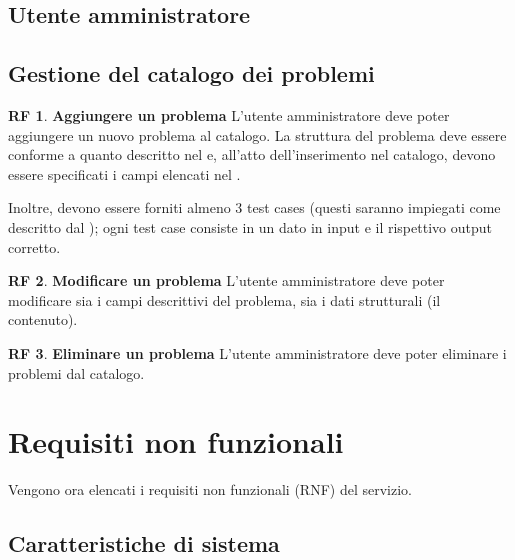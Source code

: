\documentclass[11pt, a4paper]{article}
\theoremstyle{definition}
\newtheorem{funcreq}{RF} %
\begin{document}
\begin{center}
    \section*{Utente amministratore}
\end{center}

\subsection{Gestione del catalogo dei problemi}

\begin{funcreq}
\textbf{Aggiungere un problema }
L'utente amministratore deve poter aggiungere un nuovo problema al catalogo.
La struttura del problema deve essere conforme a quanto descritto nel
\textcolor{blue}{}
e, all'atto dell'inserimento nel catalogo, devono essere specificati i campi
elencati nel \textcolor{blue}{}.

Inoltre, devono essere forniti almeno 3 test cases (questi saranno impiegati
come descritto dal \textcolor{blue}{});
ogni test case consiste in un dato in input e il rispettivo output corretto.
\end{funcreq}

\begin{funcreq}
\textbf{Modificare un problema }
L'utente amministratore deve poter modificare sia i campi descrittivi del
problema, sia i dati strutturali (il contenuto).
\end{funcreq}

\begin{funcreq}
\textbf{Eliminare un problema }
L'utente amministratore deve poter eliminare i problemi dal catalogo.
\end{funcreq}

\newpage
\section{Requisiti non funzionali}
Vengono ora elencati i requisiti non funzionali (RNF) del servizio.

\subsection{Caratteristiche di sistema}
\end{document}
